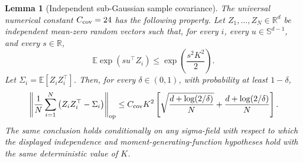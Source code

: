 \documentclass{article} %
\newtheorem{lemma}[theorem]{Lemma}
\begin{document}
\begin{lemma}[Independent sub-Gaussian sample covariance]
\label{lem:err-control-independent-subg-cov-final}
The universal numerical constant \(C_{\rm cov}=24\) has the following
property. Let \(Z_1,\ldots,Z_N\in\mathbb{R}^d\) be independent mean-zero random
vectors such that, for every \(i\), every \(u\in\mathbb{S}^{d-1}\), and every
\(s\in\mathbb{R}\),
\begin{equation}
\mathbb{E}\exp(su^\top Z_i)
\leq
\exp\!\left(\frac{s^2K^2}{2}\right).
\end{equation}
Let \(\Sigma_i=\mathbb{E}[Z_iZ_i^\top]\). Then, for every
\(\delta\in(0,1)\), with probability at least \(1-\delta\),
\begin{equation}
\left\|
\frac1N\sum_{i=1}^N
\left(Z_iZ_i^\top-\Sigma_i\right)
\right\|_{\mathrm{op}}
\leq
C_{\rm cov}K^2
\left[
\sqrt{\frac{d+\log(2/\delta)}{N}}
+
\frac{d+\log(2/\delta)}{N}
\right].
\end{equation}
The same conclusion holds conditionally on any sigma-field with respect to
which the displayed independence and moment-generating-function hypotheses hold
with the same deterministic value of \(K\).
\end{lemma}
\end{document}
